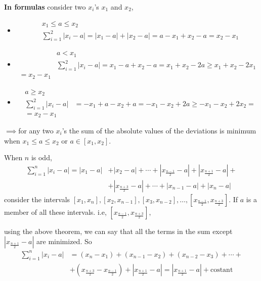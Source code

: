 \documentclass[12pt, letterpaper]{article}
\theoremstyle{definition}
\begin{document}
\textbf{In formulas} consider two $x_i$'s $x_1$ and $x_2$,
\begin{itemize}
\item \begin{align}
&x_1\leq a\leq x_2
\\ &\sum_{i=1}^{2}|x_i-a|=|x_1-a|+|x_2-a|=a-x_1+x_2-a=x_2-x_1
\end{align}
\item \begin{equation}\begin{aligned}
&a < x_1
\\&\sum_{i=1}^{2}|x_i-a|=x_1-a+x_2-a=x_1+x_2-2a\ge x_1+x_2-2x_1\\=x_2-x_1
\end{aligned}\end{equation}
\item \begin{equation}\begin{aligned}
&a\ge x_2
\\&\sum_{i=1}^{2}|x_i-a|&=-x_1+a-x_2+a=-x_1-x_2+2a\ge -x_1-x_2+2x_2=\\
&=x_2 - x_1
\end{aligned}
\end{equation}

\end{itemize}


$\implies$for any two $x_i$'s the sum of the absolute values of the deviations is minimum when $x_1\leq a\leq x_2$ or $a\in[x_1,x_2]$.

When $n$ is odd,
\begin{equation}
\begin{aligned}
\sum_{i=1}^n\left|x_i-a\right|=\left|x_1-a\right|&+\left|x_2-a\right|+\cdots+\left|x_{\tfrac{n-1}{2}}-a\right| + \left|x_{\tfrac{n+1}{2}}-a\right|+\\
&+ \left|x_{\tfrac{n+3}{2}}-a\right|+ \cdots+\left|x_{n-1}-a\right|+\left|x_n-a\right|
\end{aligned}
\end{equation}
consider the intervals $[x_1,x_n], [x_2,x_{n-1}], [x_3,x_{n-2}], \ldots, \left[x_{\tfrac{n-1}{2}}, x_{\tfrac{n+3}{2}}\right]$. If $a$ is a member of all these intervals. i.e, $\left[x_{\tfrac{n-1}{2}},x_{\tfrac{n+3}{2}}\right],$

using the above theorem, we can say that all the terms in the sum except $\left|x_{\tfrac{n+1}{2}}-a\right|$ are minimized. So
\begin{equation}
\begin{aligned}
\sum_{i=1}^n|x_i-a|&=(x_n-x_1)+(x_{n-1}-x_2)+(x_{n-2}-x_3)+\cdots +\\
& +\left(x_{\tfrac{n+3}{2}}-x_{\tfrac{n-1}{2}}\right) + \left|x_{\tfrac{n+1}{2}}-a\right| = \left|x_{\tfrac{n+1}{2}}-a \right|+\text{costant}
\end{aligned}
\end{equation}
\end{document}

